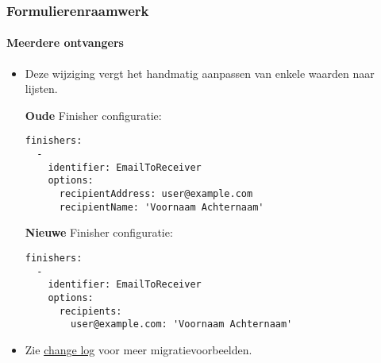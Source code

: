 
\begin{frame}[fragile]
\frametitle{Formulierenraamwerk}
\framesubtitle{Meerdere ontvangers}

	\lstset{basicstyle=\tiny\ttfamily}

	\begin{itemize}
		\item Deze wijziging vergt het handmatig aanpassen van enkele waarden naar lijsten.

		\smaller\textbf{Oude} Finisher configuratie:\normalsize
\begin{lstlisting}
finishers:
  -
    identifier: EmailToReceiver
    options:
      recipientAddress: user@example.com
      recipientName: 'Voornaam Achternaam'
\end{lstlisting}

		\smaller\textbf{Nieuwe} Finisher configuratie:\normalsize
\begin{lstlisting}
finishers:
  -
    identifier: EmailToReceiver
    options:
      recipients:
        user@example.com: 'Voornaam Achternaam'
\end{lstlisting}

		\item Zie \href{https://docs.typo3.org/c/typo3/cms-core/10.0/en-us/Changelog/master/Deprecation-80420-EmailFinisherSingleAddressOptions.html}{change log}
			voor meer migratievoorbeelden.

	\end{itemize}

\end{frame}


